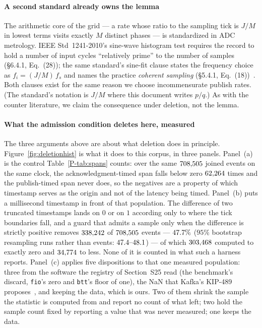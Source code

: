 \documentclass[10pt,journal,onecolumn]{IEEEtran}
\newcommand{\kafka}{Kafka}
\begin{document}
\paragraph{A second standard already owns the lemma} The arithmetic core of the grid ---
a rate whose ratio to the sampling tick is $J/M$ in lowest terms visits exactly $M$ distinct
phases --- is standardized in ADC metrology. IEEE Std~1241-2010's sine-wave histogram test
requires the record to hold a number of input cycles ``relatively prime'' to the number of
samples (\S6.4.1, Eq.~(28)); the same standard's sine-fit clause states the frequency choice
as $f_i = (J/M)\,f_s$ and names the practice \emph{coherent sampling} (\S5.4.1,
Eq.~(18))~\cite{ieee1241}. Both clauses exist for the same reason we choose incommensurate
publish rates. (The standard's notation is $J/M$ where this document writes $p/q$.) As with the
counter literature, we claim the consequence under deletion, not the lemma.

\paragraph{What the admission condition deletes here, measured} The three arguments above are about what
deletion does in principle. Figure~\ref{fig:deletionhist} is what it does to this corpus, in
three panels. Panel~(a) is the control Table~\ref{P-tab:spans} counts: over the same
$708{,}505$ joined events on the same clock, the acknowledgment-timed span falls below
zero $62{,}264$ times and the publish-timed span never does, so the negatives are a
property of which timestamp serves as the origin and not of the latency being timed. Panel~(b)
puts a millisecond timestamp in front of that population. The difference of two truncated
timestamps lands on $0$ or on $1$ according only to where the tick boundaries fall, and a guard
that admits a sample only when the difference is strictly positive removes $338{,}242$
of $708{,}505$ events --- $47.7\%$ ($95\%$ bootstrap resampling runs rather than events:
$\msGuardDeletedCI$) --- of which $303{,}468$ computed to exactly zero and
$34{,}774$ to less. None of it is counted in what such a harness reports.
Panel~(c) applies five dispositions to that one measured population: three from the software
the registry of Section~S25 read (the benchmark's discard, \texttt{fio}'s zero and
\texttt{btt}'s floor of one), the NaN that \kafka{}'s KIP-489 proposes~\cite{kafka2019kip489},
and keeping the data, which is ours. Two of them shrink the sample the statistic is computed
from and report no count of what left; two hold the sample count fixed by reporting a value
that was never measured; one keeps the data.
\end{document}

